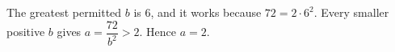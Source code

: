 The greatest permitted $b$ is $6$, and it works because $72=2\cdot6^2$. Every smaller positive $b$ gives $a=\dfrac{72}{b^2}>2$. Hence $\boxed{a=2}$.
